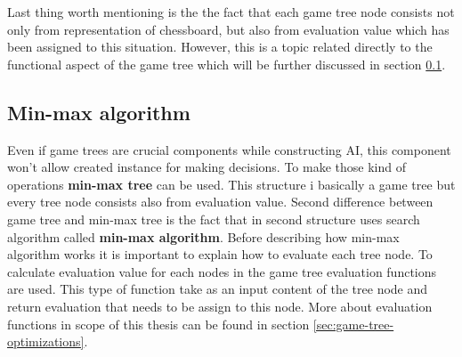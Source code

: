     Last thing worth mentioning is the the fact that each game tree node consists not only from representation of chessboard, but also from evaluation value which has been assigned to this situation. However, this is a topic related directly to the functional aspect of the game tree which will be further discussed in section \ref{sec:min-max-algorithm}.

    \subsection{Min-max algorithm}\label{sec:min-max-algorithm}
    Even if game trees are crucial components while constructing AI, this component won't allow created instance for making decisions. To make those kind of operations \textbf{min-max tree} can be used. This structure i basically a game tree but every tree node consists also from evaluation value. Second difference between game tree and min-max tree is the fact that in second structure uses search algorithm called \textbf{min-max algorithm}. Before describing how min-max algorithm works it is important to explain how to evaluate each tree node. To calculate evaluation value for each nodes in the game tree evaluation functions are used. This type of function take as an input content of the tree node and return evaluation that needs to be assign to this node. More about evaluation functions in scope of this thesis can be found in section \ref{sec:game-tree-optimizations}.

